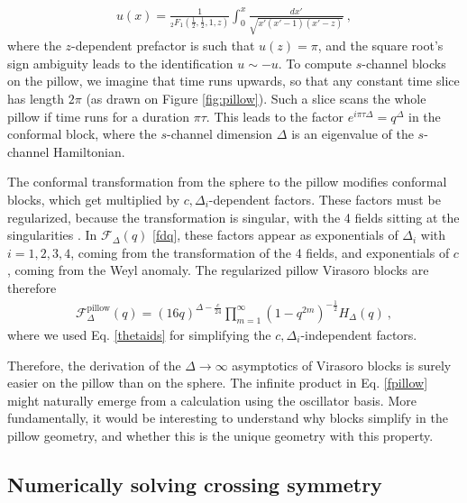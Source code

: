 \documentclass[12pt, a4paper]{article}
\begin{document}
\begin{align}
 u(x) = \frac{1}{{}_2F_1\left(\tfrac12,\tfrac12,1,z\right)} \int_0^x \frac{dx'}{\sqrt{x'(x'-1)(x'-z)}} \ ,
\end{align}
where the $z$-dependent prefactor is such that $u(z)=\pi$, and the square root's sign ambiguity leads to the identification $u\sim -u$. To compute $s$-channel blocks on the pillow, we imagine that time runs upwards, so that any constant time slice has length $2\pi$ (as drawn on Figure \eqref{fig:pillow}). Such a slice scans the whole pillow if time runs for a duration $\pi\tau$. This leads to the factor $e^{i\pi\tau\Delta}=q^\Delta$ in the conformal block, where the $s$-channel dimension $\Delta$ is an eigenvalue of the $s$-channel Hamiltonian. 

The conformal transformation from the sphere to the pillow modifies conformal blocks, which get multiplied by $c,\Delta_i$-dependent factors. These factors must be regularized, because the transformation is singular, with the 4 fields sitting at the singularities \cite[Appendix D]{msz15}. In $\mathcal{F}_\Delta(q)$ \eqref{fdq}, these factors appear as exponentials of $\Delta_i$ with $i=1,2,3,4$, coming from the transformation of the 4 fields, and exponentials of $c$, coming from the Weyl anomaly. The regularized pillow Virasoro blocks are therefore 
\begin{align}
 \mathcal{F}_\Delta^\text{pillow}(q) = (16q)^{\Delta-\frac{c}{24}} \prod_{m=1}^\infty \left(1-q^{2m}\right)^{-\frac12} H_\Delta(q)\ , 
 \label{fpillow} 
\end{align}
where we used Eq. \eqref{thetaids} for simplifying the $c,\Delta_i$-independent factors. 

Therefore, the derivation of the $\Delta\to\infty$ asymptotics of Virasoro blocks is surely easier on the pillow than on the sphere. The infinite product in Eq. \eqref{fpillow} might naturally emerge from a calculation using the oscillator basis. More fundamentally, it would be interesting to understand why blocks simplify in the pillow geometry, and whether this is the unique geometry with this property. 

\subsection{Numerically solving crossing symmetry}
\end{document}
